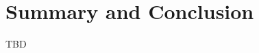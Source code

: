 \documentclass[11pt]{article}
\begin{document}
%
%
%
%
%
%
%
%
%

\pagebreak

\section{Summary and Conclusion}
TBD





\end{document}
